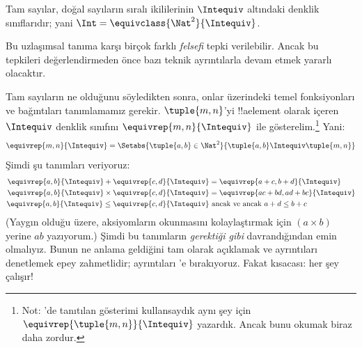 \documentclass[../../../include/open-logic-section]{subfiles}
\begin{document}
\begin{defn}
		Tam sayılar, doğal sayıların sıralı ikililerinin $\Intequiv$ altındaki
		denklik sınıflarıdır; yani $\Int = \equivclass{\Nat^2}{\Intequiv}$.
\end{defn}

Bu uzlaşımsal tanıma karşı birçok farklı \emph{felsefi} tepki verilebilir.
Ancak bu tepkileri değerlendirmeden önce bazı teknik ayrıntılarla devam etmek
yararlı olacaktır.

Tam sayıların ne olduğunu söyledikten sonra, onlar üzerindeki temel
fonksiyonları ve bağıntıları tanımlamamız gerekir. $\tuple{m, n}$'yi
!!a{element} olarak içeren $\Intequiv$ denklik sınıfını
$\equivrep{m, n}{\Intequiv}$ ile gösterelim.\footnote{Not:
'de tanıtılan gösterimi kullansaydık
aynı şey için $\equivrep{\tuple{m,n}}{\Intequiv}$ yazardık. Ancak bunu okumak
biraz daha zordur.} Yani:
	$$\equivrep{m, n}{\Intequiv} = \Setabs{\tuple{a, b} \in \Nat^2}{\tuple{a, b}\Intequiv \tuple{m, n}}$$
Şimdi şu tanımları veriyoruz:
	\begin{align*}
		\equivrep{a, b}{\Intequiv} + \equivrep{c, d}{\Intequiv} &= \equivrep{a + c, b + d}{\Intequiv}\\
		\equivrep{a, b}{\Intequiv} \times \equivrep{c, d}{\Intequiv} &= \equivrep{a c + b  d, a  d + b c}{\Intequiv}\\
		\equivrep{a, b}{\Intequiv} \leq \equivrep{c, d}{\Intequiv} &\text{ ancak ve ancak }a + d \leq b + c
	\end{align*}	
(Yaygın olduğu üzere, aksiyomların okunmasını kolaylaştırmak için
$(a \times b)$ yerine $ab$ yazıyorum.) Şimdi bu tanımların
\emph{gerektiği gibi} davrandığından emin olmalıyız. Bunun ne anlama geldiğini
tam olarak açıklamak ve ayrıntıları denetlemek epey zahmetlidir; ayrıntıları
'e bırakıyoruz. Fakat kısacası: her şey çalışır!
\end{document}
